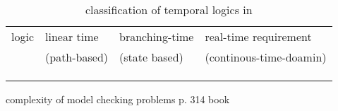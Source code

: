 \begin{table}[h]
		\begin{left}
			\begin{tabular}{l|l|l|l}
	 		logic  &  linear time  &  branching-time  & real-time requirement  \\ 
	 		       &  (path-based) &  (state based)   & (continous-time-doamin) \\  \hline 
		           &   \checkmark  &                  &                         \\  
		     	   &               &  \checkmark      &     \checkmark          \\  
		     	   &               &  \checkmark       &    \checkmark          \\   
	        \end{tabular}
		\end{left}
		\label{tab:CoqAndPreciateLogic}
		\caption{classification of temporal logics in \cite{BK} } 
	\end{table}
	
complexity of model checking problems
p. 314 book \cite{BK}

